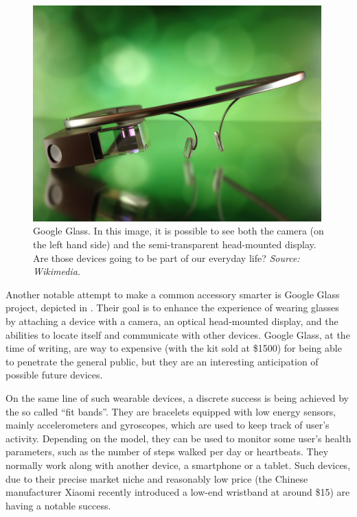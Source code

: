 \documentclass[12pt,a4paper,twoside,openright]{book}
\begin{document}
\begin{figure}
	\centering
	\includegraphics[width=0.99\textwidth]{img/gglass}
	\caption[Google Glass]{Google Glass. In this image, it is possible to see both the camera (on the left hand side) and the semi-transparent head-mounted display. Are those devices going to be part of our everyday life? \emph{Source: Wikimedia.}}
	\label{img:gglass}
\end{figure}

Another notable attempt to make a common accessory smarter is Google Glass project, depicted in .
%
Their goal is to enhance the experience of wearing glasses by attaching a device with a camera, an optical head-mounted display, and the abilities to locate itself and communicate with other devices.
%
Google Glass, at the time of writing, are way to expensive (with the kit sold at \$1500) for being able to penetrate the general public, but they are an interesting anticipation of possible future devices.

On the same line of such wearable devices, a discrete success is being achieved by the so called ``fit bands''.
%
They are bracelets equipped with low energy sensors, mainly accelerometers and gyroscopes, which are used to keep track of user's activity.
%
Depending on the model, they can be used to monitor some user's health parameters, such as the number of steps walked per day or heartbeats.
%
They normally work along with another device, a smartphone or a tablet.
%
Such devices, due to their precise market niche and reasonably low price (the Chinese manufacturer Xiaomi recently introduced a low-end wristband at around \$15) are having a notable success.
\end{document}
